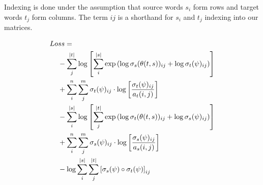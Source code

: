 \documentclass[twoside,twocolumn]{article}
\newlength\mystoreparindent
\newenvironment{myparindent}[1]{%
  \setlength{\mystoreparindent}{\the\parindent}
  \setlength{\parindent}{#1}
  }{%
  \setlength{\parindent}{\mystoreparindent}
}
\begin{document}
\begin{myparindent}{0pt}
Indexing is done under the assumption that source words $s_i$ form rows
and target words $t_j$ form columns. The term $ij$ is a shorthand
for $s_i$ and $t_j$ indexing into our matrices.

\begin{equation}
  \centering
\begin{split}
  Lo&ss = \\
  &- \sum_j^{|t|} \log \left[
      \sum_i^{|s|} \exp \left(
        \log \sigma_s(\theta(t, s))_{ij} + \log \sigma_t(\psi)_{ij} \right)
    \right] \\
  &+ \sum_i^n \sum_j^m \sigma_t(\psi)_{ij} \cdot \log \left[
    \frac{\sigma_t(\psi)_{ij}}{a_t(i, j)} \right] \\
  &- \sum_i^{|s|} \log \left[ \sum_j^{|t|}
      \exp \left(
        \log \sigma_t(\theta(t, s))_{ij} + \log \sigma_s(\psi)_{ij}
      \right)
    \right] \\
  &+ \sum_i^n \sum_j^m \sigma_s(\psi)_{ij} \cdot \log \left[
    \frac{\sigma_s(\psi)_{ij}}{a_s(i, j)} \right] \\
  &- \log \sum_i^{|s|} \sum_j^{|t|} \left[
    \sigma_s(\psi) \circ \sigma_t(\psi) \right]_{ij} \\
\end{split}
\end{equation}

\end{myparindent}
\end{document}
